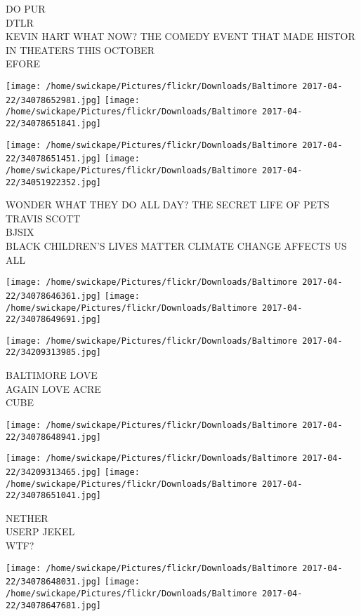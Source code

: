 \documentclass[10pt,letterpaper]{article}
\begin{document}
DO PUR\\
DTLR\\
KEVIN HART WHAT NOW?  THE COMEDY EVENT THAT MADE HISTOR IN THEATERS THIS OCTOBER\\
EFORE
\pagebreak

\texttt{[image: /home/swickape/Pictures/flickr/Downloads/Baltimore 2017-04-22/34078652981.jpg]}
\texttt{[image: /home/swickape/Pictures/flickr/Downloads/Baltimore 2017-04-22/34078651841.jpg]}

\texttt{[image: /home/swickape/Pictures/flickr/Downloads/Baltimore 2017-04-22/34078651451.jpg]}
\texttt{[image: /home/swickape/Pictures/flickr/Downloads/Baltimore 2017-04-22/34051922352.jpg]}

WONDER WHAT THEY DO ALL DAY?  THE SECRET LIFE OF PETS\\
TRAVIS SCOTT\\
BJSIX\\
BLACK CHILDREN'S LIVES MATTER CLIMATE CHANGE AFFECTS US ALL
\pagebreak

\texttt{[image: /home/swickape/Pictures/flickr/Downloads/Baltimore 2017-04-22/34078646361.jpg]}
\texttt{[image: /home/swickape/Pictures/flickr/Downloads/Baltimore 2017-04-22/34078649691.jpg]}

\texttt{[image: /home/swickape/Pictures/flickr/Downloads/Baltimore 2017-04-22/34209313985.jpg]}

BALTIMORE LOVE\\
AGAIN LOVE ACRE\\
CUBE
\pagebreak

\texttt{[image: /home/swickape/Pictures/flickr/Downloads/Baltimore 2017-04-22/34078648941.jpg]}

\vspace{0.25in}
\texttt{[image: /home/swickape/Pictures/flickr/Downloads/Baltimore 2017-04-22/34209313465.jpg]}
\texttt{[image: /home/swickape/Pictures/flickr/Downloads/Baltimore 2017-04-22/34078651041.jpg]}

NETHER\\
USERP JEKEL\\
WTF?
\pagebreak

\texttt{[image: /home/swickape/Pictures/flickr/Downloads/Baltimore 2017-04-22/34078648031.jpg]}
\texttt{[image: /home/swickape/Pictures/flickr/Downloads/Baltimore 2017-04-22/34078647681.jpg]}
\end{document}
